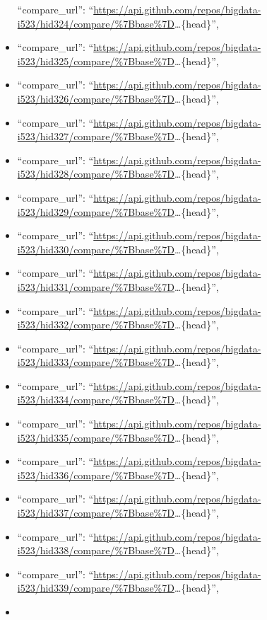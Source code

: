 \begin{itemize}
  ``compare\_url'':
  ``\url{https://api.github.com/repos/bigdata-i523/hid324/compare/\%7Bbase\%7D}\ldots{}\{head\}'',
\item
  ``compare\_url'':
  ``\url{https://api.github.com/repos/bigdata-i523/hid325/compare/\%7Bbase\%7D}\ldots{}\{head\}'',
\item
  ``compare\_url'':
  ``\url{https://api.github.com/repos/bigdata-i523/hid326/compare/\%7Bbase\%7D}\ldots{}\{head\}'',
\item
  ``compare\_url'':
  ``\url{https://api.github.com/repos/bigdata-i523/hid327/compare/\%7Bbase\%7D}\ldots{}\{head\}'',
\item
  ``compare\_url'':
  ``\url{https://api.github.com/repos/bigdata-i523/hid328/compare/\%7Bbase\%7D}\ldots{}\{head\}'',
\item
  ``compare\_url'':
  ``\url{https://api.github.com/repos/bigdata-i523/hid329/compare/\%7Bbase\%7D}\ldots{}\{head\}'',
\item
  ``compare\_url'':
  ``\url{https://api.github.com/repos/bigdata-i523/hid330/compare/\%7Bbase\%7D}\ldots{}\{head\}'',
\item
  ``compare\_url'':
  ``\url{https://api.github.com/repos/bigdata-i523/hid331/compare/\%7Bbase\%7D}\ldots{}\{head\}'',
\item
  ``compare\_url'':
  ``\url{https://api.github.com/repos/bigdata-i523/hid332/compare/\%7Bbase\%7D}\ldots{}\{head\}'',
\item
  ``compare\_url'':
  ``\url{https://api.github.com/repos/bigdata-i523/hid333/compare/\%7Bbase\%7D}\ldots{}\{head\}'',
\item
  ``compare\_url'':
  ``\url{https://api.github.com/repos/bigdata-i523/hid334/compare/\%7Bbase\%7D}\ldots{}\{head\}'',
\item
  ``compare\_url'':
  ``\url{https://api.github.com/repos/bigdata-i523/hid335/compare/\%7Bbase\%7D}\ldots{}\{head\}'',
\item
  ``compare\_url'':
  ``\url{https://api.github.com/repos/bigdata-i523/hid336/compare/\%7Bbase\%7D}\ldots{}\{head\}'',
\item
  ``compare\_url'':
  ``\url{https://api.github.com/repos/bigdata-i523/hid337/compare/\%7Bbase\%7D}\ldots{}\{head\}'',
\item
  ``compare\_url'':
  ``\url{https://api.github.com/repos/bigdata-i523/hid338/compare/\%7Bbase\%7D}\ldots{}\{head\}'',
\item
  ``compare\_url'':
  ``\url{https://api.github.com/repos/bigdata-i523/hid339/compare/\%7Bbase\%7D}\ldots{}\{head\}'',
\item

\end{itemize}
